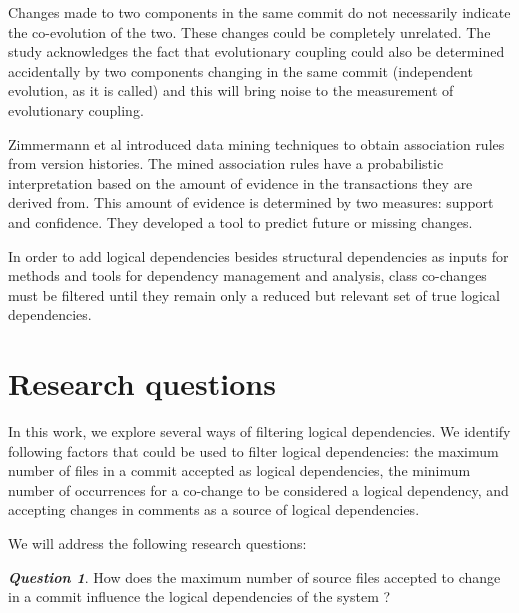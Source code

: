 \documentclass[conference]{IEEEtran}
\begin{document}
Changes made to two components in the same commit do not necessarily indicate the co-evolution of the two. These changes could be completely unrelated. The study \cite{Yu2007} acknowledges the fact that evolutionary coupling could also be determined accidentally by two components changing in the same commit (independent evolution, as it is called) and this will bring noise to the measurement of evolutionary coupling. 


Zimmermann et al \cite{Zimmermann:2004:MVH:998675.999460} introduced data mining techniques to obtain association
rules from version histories.
The mined association rules  have a probabilistic interpretation based on the amount of
evidence in the transactions they are derived from. This
amount of evidence is determined by two measures: 
support and confidence.  They developed a tool to predict future or
missing changes.




In order to add logical dependencies besides structural dependencies as inputs for methods and tools for dependency management and analysis, class co-changes must be filtered until they remain only a reduced but relevant set of true logical dependencies. 


\section{Research questions}
\label{sec:question}

In this work, we explore several ways of filtering logical dependencies.  We identify following factors that could be used to filter logical dependencies: the maximum number of files in a commit accepted as logical dependencies, the minimum number of occurrences for a co-change to be considered a logical dependency, and accepting changes in comments as a source of logical dependencies. 

We will address the following research questions:


\textit{\textbf{Question 1}}. How does the maximum number of source files accepted to change in a commit influence the logical dependencies of the system ? 
\end{document}
